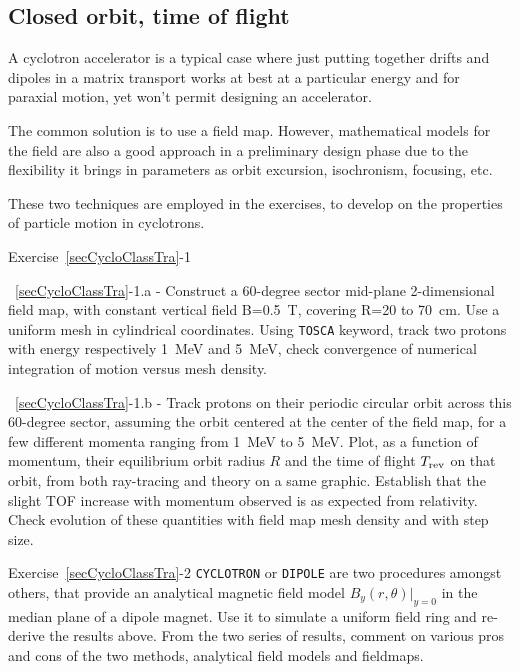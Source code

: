 \subsection{Closed orbit, time of flight \label{secCycloClassTra}}

A cyclotron accelerator is a typical case 
where just putting together drifts and dipoles in a matrix transport works at best 
at a particular energy and for paraxial motion, yet won't permit designing an accelerator. 

The common solution is to use a field map. However, mathematical models for the field 
are also a good approach in a preliminary design phase due to the flexibility it brings 
in parameters as orbit excursion, isochronism, focusing, etc.

These two techniques are employed  in the exercises, to develop on the properties of particle motion 
in cyclotrons. 

\smallskip
\noindent {\small $\bullet$} Exercise~\ref{secCycloClassTra}-1 

\noindent ~\ref{secCycloClassTra}-1.a - 
Construct a 60-degree sector mid-plane 2-dimensional field map, with constant vertical field 
B=0.5~T, covering R=20 to 70~cm. Use a uniform mesh in cylindrical coordinates. 
Using \texttt{TOSCA} keyword, track two protons with energy respectively 1~MeV and 5~MeV, 
check convergence of numerical integration of motion versus mesh density. 

\noindent ~\ref{secCycloClassTra}-1.b - 
Track protons on their periodic circular orbit across this 60-degree sector, 
assuming the orbit centered at the center of the field map, 
for a few different momenta ranging from 1~MeV to 5~MeV.
 Plot, as a function of momentum, their 
equilibrium orbit radius $R$ and the time of flight $T_{\rm rev}$ on that orbit, 
 from both ray-tracing and  theory on a same graphic. 
Establish that the slight TOF increase with momentum observed is as expected from relativity. 
Check evolution of these quantities with field map mesh density and with step size.



\smallskip
\noindent {\small $\bullet$} Exercise~\ref{secCycloClassTra}-2 
 \verb|CYCLOTRON| or \verb|DIPOLE| are two procedures amongst others, that provide an analytical 
 magnetic field model ${B_y(r,\theta)|_{y=0}}$ in the median plane of a dipole magnet. 
Use it to simulate a uniform field ring and re-derive the results above. 
From the two series of results, comment on various pros and cons of the two methods, analytical field models and 
fieldmaps.


